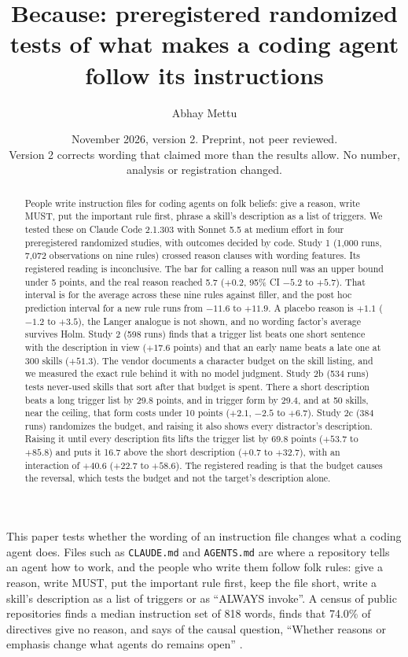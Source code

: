 \documentclass[10pt]{article}
\title{Because: preregistered randomized tests of what makes a coding agent follow its instructions}
\author{Abhay Mettu}
\date{November 2026, version 2. Preprint, not peer reviewed.\\ Version 2 corrects wording that claimed more than the results allow. No number, analysis or registration changed.}
\makeatletter
\newcommand{\code}[1]{\texttt{#1}}
\renewcommand\section{\@startsection{section}{1}{\z@}{1.6ex plus .4ex minus .2ex}{0.6ex plus .2ex}{\normalfont\large\bfseries}}
\makeatother
\begin{document}
\maketitle

\begin{abstract}
\noindent People write instruction files for coding agents on folk beliefs: give a reason, write MUST, put the important rule first, phrase a skill's description as a list of triggers. We tested these on Claude Code 2.1.303 with Sonnet 5.5 at medium effort in four preregistered randomized studies, with outcomes decided by code. Study 1 (1,000 runs, 7,072 observations on nine rules) crossed reason clauses with wording features. Its registered reading is inconclusive. The bar for calling a reason null was an upper bound under 5 points, and the real reason reached 5.7 ($+0.2$, 95\% CI $-5.2$ to $+5.7$). That interval is for the average across these nine rules against filler, and the post hoc prediction interval for a new rule runs from $-11.6$ to $+11.9$. A placebo reason is $+1.1$ ($-1.2$ to $+3.5$), the Langer analogue is not shown, and no wording factor's average survives Holm. Study 2 (598 runs) finds that a trigger list beats one short sentence with the description in view ($+17.6$ points) and that an early name beats a late one at 300 skills ($+51.3$). The vendor documents a character budget on the skill listing, and we measured the exact rule behind it with no model judgment. Study 2b (534 runs) tests never-used skills that sort after that budget is spent. There a short description beats a long trigger list by 29.8 points, and in trigger form by 29.4, and at 50 skills, near the ceiling, that form costs under 10 points ($+2.1$, $-2.5$ to $+6.7$). Study 2c (384 runs) randomizes the budget, and raising it also shows every distractor's description. Raising it until every description fits lifts the trigger list by 69.8 points ($+53.7$ to $+85.8$) and puts it 16.7 above the short description ($+0.7$ to $+32.7$), with an interaction of $+40.6$ ($+22.7$ to $+58.6$). The registered reading is that the budget causes the reversal, which tests the budget and not the target's description alone.
\end{abstract}

\section{The question}

This paper tests whether the wording of an instruction file changes what a coding agent does. Files such as \code{CLAUDE.md} and \code{AGENTS.md} are where a repository tells an agent how to work, and the people who write them follow folk rules: give a reason, write MUST, put the important rule first, keep the file short, write a skill's description as a list of triggers or as ``ALWAYS invoke''. A census of public repositories finds a median instruction set of 818 words, finds that 74.0\% of directives give no reason, and says of the causal question, ``Whether reasons or emphasis change what agents do remains open'' \citep{zarzycki2026}.
\end{document}
